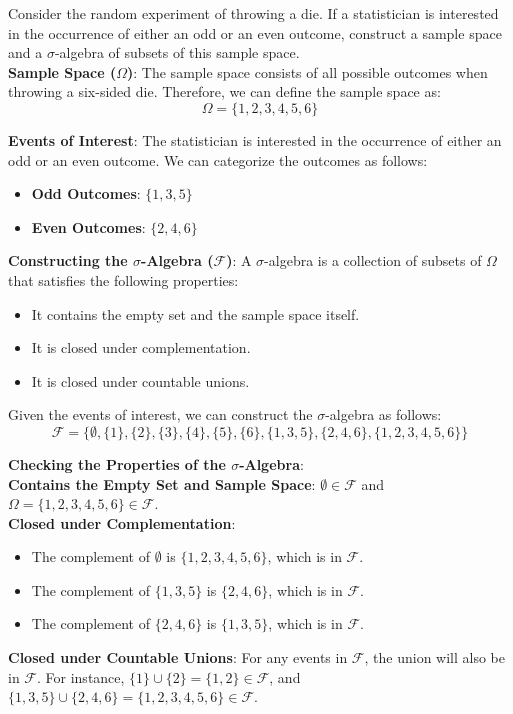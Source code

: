 \begin{example}
    Consider the random experiment of throwing a die. If a statistician is interested in the occurrence of either an odd or an even outcome, construct a sample space and a $\sigma$-algebra of subsets of this sample space.\\

    \textbf{Sample Space (\(\Omega\))}:  The sample space consists of all possible outcomes when throwing a six-sided die. Therefore, we can define the sample space as:
\[
\Omega = \{1, 2, 3, 4, 5, 6\}
\]

\textbf{Events of Interest}:  The statistician is interested in the occurrence of either an odd or an even outcome. We can categorize the outcomes as follows:
\begin{itemize}
    \item \textbf{Odd Outcomes}: \( \{1, 3, 5\} \)
    \item \textbf{Even Outcomes}: \( \{2, 4, 6\} \)
\end{itemize}

\textbf{Constructing the \(\sigma\)-Algebra (\(\mathcal{F}\))}: A \(\sigma\)-algebra is a collection of subsets of \(\Omega\) that satisfies the following properties:
\begin{itemize}
    \item It contains the empty set and the sample space itself.
    \item It is closed under complementation.
    \item It is closed under countable unions.
\end{itemize}

Given the events of interest, we can construct the \(\sigma\)-algebra as follows:
\[
\mathcal{F} = \{ \emptyset, \{1\}, \{2\}, \{3\}, \{4\}, \{5\}, \{6\}, \{1, 3, 5\}, \{2, 4, 6\}, \{1, 2, 3, 4, 5, 6\} \}
\]

\textbf{Checking the Properties of the \(\sigma\)-Algebra}:\\

 \textbf{Contains the Empty Set and Sample Space}: \(\emptyset \in \mathcal{F}\) and \(\Omega = \{1, 2, 3, 4, 5, 6\} \in \mathcal{F}\).\\
    
\textbf{Closed under Complementation}: 
    \begin{itemize}
        \item The complement of \(\emptyset\) is \(\{1, 2, 3, 4, 5, 6\}\), which is in \(\mathcal{F}\).
        \item The complement of \(\{1, 3, 5\}\) is \(\{2, 4, 6\}\), which is in \(\mathcal{F}\).
        \item The complement of \(\{2, 4, 6\}\) is \(\{1, 3, 5\}\), which is in \(\mathcal{F}\).
    \end{itemize}
    
\textbf{Closed under Countable Unions}: For any events in \(\mathcal{F}\), the union will also be in \(\mathcal{F}\). For instance, 
    \(\{1\} \cup \{2\} = \{1, 2\} \in \mathcal{F}\), and 
    \(\{1, 3, 5\} \cup \{2, 4, 6\} = \{1, 2, 3, 4, 5, 6\} \in \mathcal{F}\).\\

\end{example}

